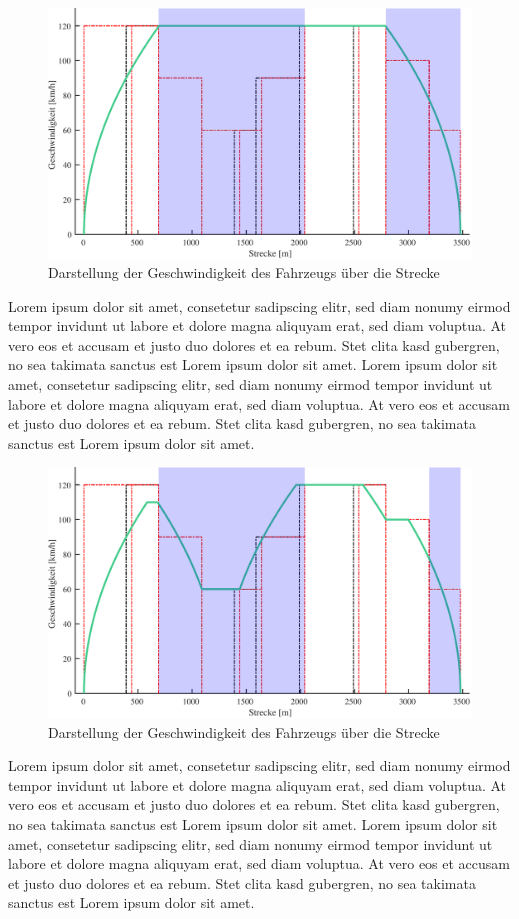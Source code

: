 \begin{figure}[H]
  \includegraphics[width=\linewidth]{../matlab/it_1.pdf}
  \caption{Darstellung der Geschwindigkeit des Fahrzeugs über die Strecke}
\end{figure}
Lorem ipsum dolor sit amet, consetetur sadipscing elitr, sed diam nonumy eirmod tempor invidunt ut labore et dolore magna aliquyam erat, sed diam voluptua. At vero eos et accusam et justo duo dolores et ea rebum. Stet clita kasd gubergren, no sea takimata sanctus est Lorem ipsum dolor sit amet. Lorem ipsum dolor sit amet, consetetur sadipscing elitr, sed diam nonumy eirmod tempor invidunt ut labore et dolore magna aliquyam erat, sed diam voluptua. At vero eos et accusam et justo duo dolores et ea rebum. Stet clita kasd gubergren, no sea takimata sanctus est Lorem ipsum dolor sit amet.
\begin{figure}[H]
  \includegraphics[width=\linewidth]{../matlab/it_2.pdf}
  \caption{Darstellung der Geschwindigkeit des Fahrzeugs über die Strecke}
\end{figure}
Lorem ipsum dolor sit amet, consetetur sadipscing elitr, sed diam nonumy eirmod tempor invidunt ut labore et dolore magna aliquyam erat, sed diam voluptua. At vero eos et accusam et justo duo dolores et ea rebum. Stet clita kasd gubergren, no sea takimata sanctus est Lorem ipsum dolor sit amet. Lorem ipsum dolor sit amet, consetetur sadipscing elitr, sed diam nonumy eirmod tempor invidunt ut labore et dolore magna aliquyam erat, sed diam voluptua. At vero eos et accusam et justo duo dolores et ea rebum. Stet clita kasd gubergren, no sea takimata sanctus est Lorem ipsum dolor sit amet.
